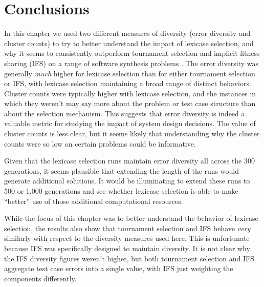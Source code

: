 
\section{Conclusions}

In this chapter we used two different measures of diversity (error diversity and cluster counts) to try to better understand the impact of lexicase selection, and why it seems to consistently outperform tournament selection and implicit fitness sharing (IFS) on a range of software synthesis problems \cite{Helmuth:2015:GECCO}. The error diversity was generally \emph{much} higher for lexicase selection than for either tournament selection or IFS, with lexicase selection maintaining a broad range of distinct behaviors. Cluster counts were typically higher with lexicase selection, and the instances in which they weren't may say more about the problem or test case structure than about the selection mechanism. This suggests that error diversity is indeed a valuable metric for studying the impact of system design decisions. The value of cluster counts is less clear, but it seems likely that understanding why the cluster counts were so low on certain problems could be informative.

Given that the lexicase selection runs maintain error diversity all across the 300 generations, it seems plausible that extending the length of the runs would generate additional solutions. It would be illuminating to extend these runs to 500 or 1,000 generations and see whether lexicase selection is able to make ``better'' use of those additional computational resources.

While the focus of this chapter was to better understand the behavior of lexicase selection, the results also show that tournament selection and IFS behave \emph{very} similarly with respect to the diversity measures used here. This is unfortunate because IFS was specifically designed to maintain diversity. It is not clear why the IFS diversity figures weren't higher, but both tournament selection and IFS aggregate test case errors into a single value, with IFS just weighting the components differently. 

